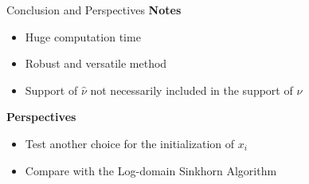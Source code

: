 \begin{frame}{Conclusion and Perspectives}
    \textbf{Notes}
    \begin{itemize}
        \item Huge computation time
        \item Robust and versatile method
        \item Support of $\hat{\nu}$ not necessarily included in the support of $\nu$
    \end{itemize}
    \textbf{Perspectives}
    \begin{itemize}
        \item Test another choice for the initialization of $x_i$
        \item Compare with the Log-domain Sinkhorn Algorithm
    \end{itemize}
\end{frame}